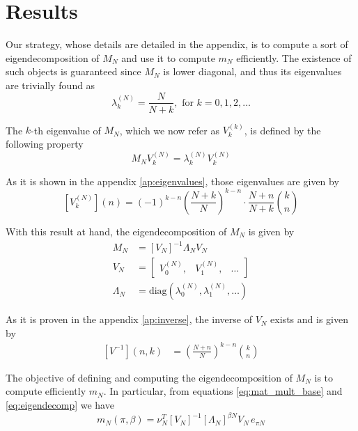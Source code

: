 \documentclass{article}
\newcommand{\ppar}[1]{\left( #1 \right)}
\newcommand{\spar}[1]{\left[ #1 \right]}
\begin{document}

\section{Results}
\label{sec:result}

Our strategy, whose details are detailed in the appendix, is to compute a sort of eigendecomposition of $M_N$ and use it to compute $m_N$ efficiently.
%
The existence of such objects is guaranteed since $M_N$ is lower diagonal, and thus its eigenvalues are trivially found as
\begin{equation}
    \lambda^{(N)}_k = \frac{N}{N+k}, \text{ for } k=0,1, 2, \dots
\end{equation}

The $k$-th eigenvalue of $M_N$, which we now refer as $V_k^{(k)}$, is defined by the following property
\begin{equation}
    M_N V_k^{(N)} = \lambda^{(N)}_k V_k^{(N)}
\end{equation}

As it is shown in the appendix \ref{ap:eigenvalues}, those eigenvalues are given by
\begin{equation}
    \spar{V_k^{(N)}}(n) =
    (-1)^{k-n} \ppar{\frac{N+k}{N}}^{k-n} \cdot \frac{N+n}{N+k} \binom{k}{n}
\end{equation}

With this result at hand, the eigendecomposition of $M_N$ is given by
\begin{align}
    M_N &= \spar{V_N}^{-1} \Lambda_N V_N 
    \label{eq:eigendecomp}
    \\
    V_N &= \begin{bmatrix}
        V_0^{(N)}, & V_1^{(N)}, & \dots
    \end{bmatrix} \\
    \Lambda_N &= \text{diag}\ppar{\lambda^{(N)}_0, \lambda^{(N)}_1, \dots}
\end{align}

As it is proven in the appendix \ref{ap:inverse}, the inverse of $V_N$ exists and is given by
\begin{align}
    \spar{V^{-1}}(n,k) &=
    \ppar{\frac{N+n}{N}}^{k-n} \binom{k}{n}
\end{align}

The objective of defining and computing the eigendecomposition of $M_N$ is to compute efficiently $m_N$.
%
In particular, from equations \eqref{eq:mat_mult_base} and \eqref{eq:eigendecomp} we have
\begin{equation}
    m_N(\pi, \beta) = \nu_N^T 
    \spar{V_N}^{-1} \spar{\Lambda_N}^{\beta N} V_N\,
    e_{\pi N}
\end{equation}
\end{document}
